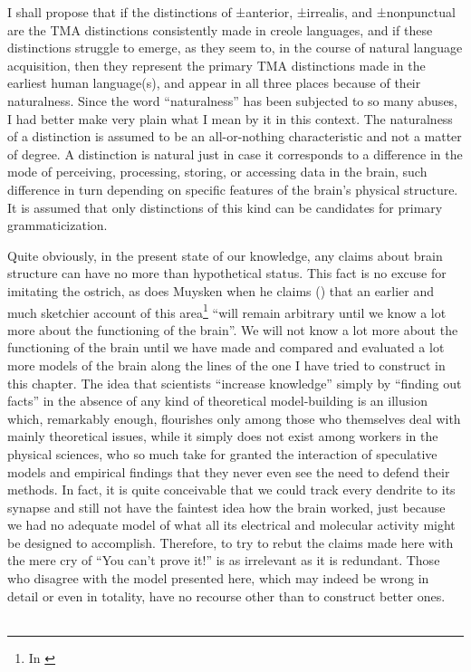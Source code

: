 I shall propose that if the distinctions of ±anterior, ±irrealis, and ±nonpunctual are the TMA distinctions consistently made in creole languages, and if these distinctions struggle to emerge, as they seem to, in the course of natural language acquisition, then they represent the primary TMA distinctions made in the earliest human language(s), and appear in all three places because of their naturalness. Since the word ``naturalness'' has been subjected to so many abuses, I had better make very plain what I mean by it in this context. The naturalness of a distinction is assumed to be an all-or-nothing characteristic and not a matter of degree. A distinction is natural just in case it corresponds to a difference in the mode of perceiving, processing, storing, or accessing data in the brain, such difference in turn depending on specific features of the brain's physical structure. It is assumed that only distinctions of this kind can be candidates for primary grammaticization.

Quite obviously, in the present state of our knowledge, any claims about brain structure can have no more than hypothetical status. This fact is no excuse for imitating the ostrich, as does Muysken when he claims (\citeyear{Muysken1981a}) that an earlier and much sketchier account of this area\footnote{In \citealt{Bickerton1974}} ``will remain arbitrary until we know a lot more about the functioning of the brain''. We will not know a lot more about the functioning of the brain until we have made and compared and evaluated a lot more models of the brain along the lines of the one I have tried to construct in this chapter. The idea that scientists ``increase knowledge'' simply by ``finding out facts'' in the absence of any kind of theoretical model-building is an illusion which, remarkably enough, flourishes only among those who themselves deal with mainly theoretical issues, while it simply does not exist among workers in the physical sciences, who so much take for granted the interaction of speculative models and empirical findings that they never even see the need to defend their methods. In fact, it is quite conceivable that we could track every dendrite to its synapse and still not have the faintest idea
how the brain worked, just because we had no adequate model of what all its electrical and molecular activity might be designed to accomplish. Therefore, to try to rebut the claims made here with the mere cry of ``You can't prove it!'' is as irrelevant as it is redundant. Those who disagree with the model presented here, which may indeed be wrong in detail or even in totality, have no recourse other than to construct better ones.\\\\

